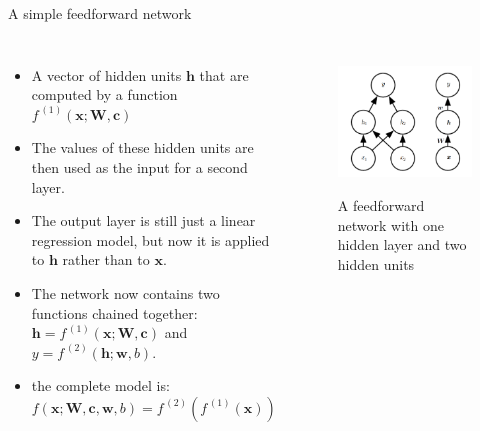 \documentclass[10pt]{beamer}
\begin{document}
	\begin{frame}{A simple feedforward network}
		\begin{columns}[T]
			\begin{itemize}
				\item A vector of hidden units $\bm{h}$ that are computed by a function $f^{\,(1)}(\bm{x};\bm{W},\bm{c})$
				\onslide<2->
				\item The values of these hidden units are then used as the input for a second layer.
				\onslide<3->
				\item The output layer is still just a linear regression model, but now it is applied to $\bm{h}$ rather than to $\bm{x}$.
				\onslide<4->
				\item The network now contains two functions chained together: $\bm{h}=f^{\,(1)}(\bm{x};\bm{W},\bm{c})$ and $y=f^{\,(2)}(\bm{h};\bm{w},b)$.
				\item the complete model is: $f(\bm{x};\bm{W},\bm{c},\bm{w},b)=f^{\,(2)}(f^{\,(1)}(\bm{x}))$
			\end{itemize}
		
			\begin{figure}
				\caption{A feedforward network with one hidden layer and two hidden units}
				\includegraphics[height=10em]{figures/network-one-hidden-layer-two-hidden-unit.png}
			\end{figure}
		\end{columns}
	\end{frame}
\end{document}
